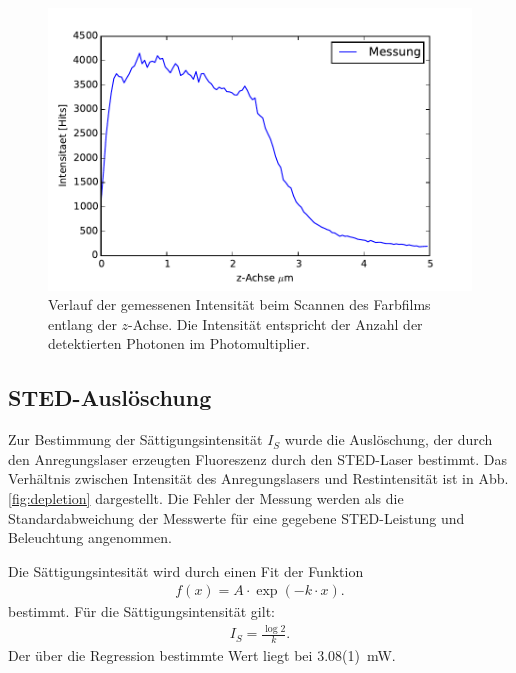 \begin{figure}
	\centering
	\includegraphics[width=\textwidth]{plots/tiefe.pdf}
	\caption{Verlauf der gemessenen Intensität beim Scannen des Farbfilms entlang der $z$-Achse. Die Intensität entspricht der Anzahl der detektierten Photonen im Photomultiplier.
	}\label{fig:tiefe}
\end{figure}

\subsection{STED-Auslöschung}
Zur Bestimmung der Sättigungsintensität $I_S$ wurde die Auslöschung, der durch den Anregungslaser erzeugten Fluoreszenz durch den STED-Laser bestimmt. 
Das Verhältnis zwischen Intensität des Anregungslasers und Restintensität ist in Abb. \ref{fig:depletion} dargestellt.
Die Fehler der Messung werden als die Standardabweichung der Messwerte für eine gegebene STED-Leistung und Beleuchtung angenommen.

Die Sättigungsintesität wird durch einen Fit der Funktion
\begin{align}
	f(x) = A \cdot \exp \left( -k \cdot x  \right).
\end{align}
bestimmt.
Für die Sättigungsintensität gilt:
\begin{align}
	I_{S} = \frac{\log 2}{k}.
\end{align}
Der über die Regression bestimmte Wert liegt bei 3.08(1)~mW.

